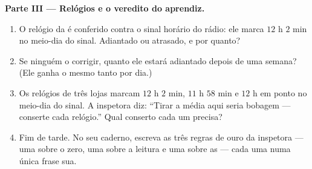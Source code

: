 \begin{problem}
\medskip\noindent\textbf{Parte III --- Relógios e o veredito do
aprendiz.}
\begin{enumerate}[resume]
  \item O relógio da  é conferido contra o sinal horário do
        rádio: ele marca $12$ h $2$ min no meio-dia do sinal.
        Adiantado ou atrasado, e por quanto?
  \item Se ninguém o corrigir, quanto ele estará adiantado depois de
        uma semana? (Ele ganha o mesmo tanto por dia.)
  \item Os relógios de três lojas marcam $12$ h $2$ min, $11$ h $58$
        min e $12$ h em ponto no meio-dia do sinal. A inspetora diz:
        ``Tirar a média aqui seria bobagem --- conserte cada
        relógio.'' Qual conserto cada um precisa?
  \item Fim de tarde. No seu caderno, escreva as três regras de ouro
        da inspetora --- uma sobre o zero, uma sobre a leitura e uma
        sobre as  --- cada uma numa única frase sua.
\end{enumerate}
\end{problem}
